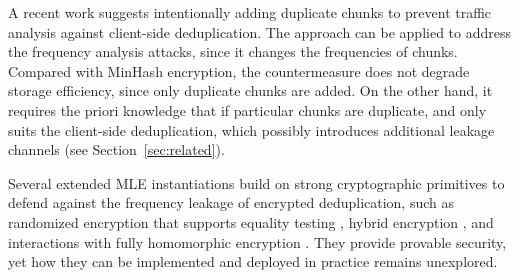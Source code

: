 A recent work \cite{zuo18} suggests intentionally adding duplicate chunks to prevent traffic analysis against client-side deduplication. The approach \cite{zuo18} can be applied to address the frequency analysis attacks, since it changes the frequencies of chunks. Compared with MinHash encryption, the countermeasure \cite{zuo18} does not degrade storage efficiency, since only duplicate chunks are added. On the other hand, it  requires the priori knowledge that if particular chunks are duplicate, and only suits the client-side deduplication, which possibly introduces additional leakage channels (see Section~\ref{sec:related}).  

Several extended MLE instantiations build on strong cryptographic primitives to defend against the frequency leakage of encrypted deduplication, such as randomized encryption that supports equality testing \cite{abadi13}, hybrid encryption \cite{stanek14}, and interactions with fully homomorphic encryption \cite{bellare15}. They provide provable security, yet how they can be implemented and deployed in practice remains unexplored. 

 







